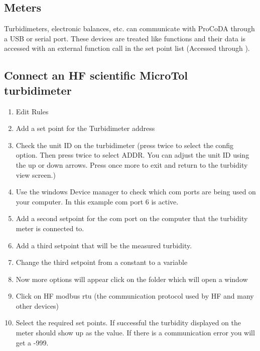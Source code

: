 \documentclass[letterpaper,10pt,english]{sphinxmanual}
\begin{document}
\subsection{Meters}
\label{\detokenize{ProCoDA/ProCoDA:meters}}\label{\detokenize{ProCoDA/ProCoDA:heading-procoda-meters}}
Turbidimeters, electronic balances, etc. can communicate with ProCoDA through a USB or serial port. These devices are treated like functions and their data is accessed with an external function call in the set point list (Accessed through ).


\subsection{Connect an HF scientific MicroTol turbidimeter}
\label{\detokenize{ProCoDA/ProCoDA:connect-an-hf-scientific-microtol-turbidimeter}}\begin{enumerate}
\item {} 
Edit Rules

\item {} 
Add a set point for the Turbidimeter address 

\item {} 
Check the unit ID on the turbidimeter (press  twice to select the config option. Then press  twice to select ADDR. You can adjust the unit ID using the up or down arrows. Press  once more to exit and return to the turbidity view screen.)

\item {} 
Use the windows Device manager to check which com ports are being used on your computer. In this example com port 6 is active. 

\item {} 
Add a second setpoint for the com port on the computer that the turbidity meter is connected to. 

\item {} 
Add a third setpoint that will be the measured turbidity.

\item {} 
Change the third setpoint from a constant to a variable

\item {} 
Now more options will appear click on the folder which will open a window

\item {} 
Click on HF modbus rtu (the communication protocol used by HF and many other devices) 

\item {} 
Select the required set points.  If successful the turbidity displayed on the meter should show up as the value. If there is a communication error you will get a -999.

\end{enumerate}
\end{document}

